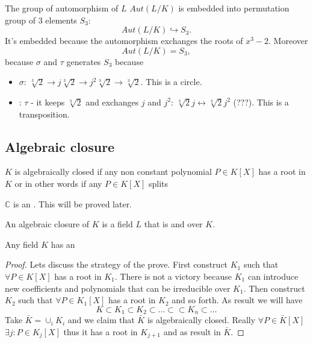 \begin{example}
  The group of automorphism of $L$ $Aut\left(L/K\right)$ is embedded
  into permutation group of 3 elements $S_3$:
  \[
  Aut\left(L/K\right) \hookrightarrow S_3.
  \]
  It's embedded because the automorphism exchanges the roots of
  $x^3-2$. Moreover
  \[
  Aut\left(L/K\right) = S_3,
  \]
  because $\sigma$ and $\tau$ generates $S_3$ because
  \begin{itemize}
  \item $\sigma$: $\sqrt[3]{2} \to j \sqrt[3]{2} \to j^2 \sqrt[3]{2}
    \to \sqrt[3]{2}$. This is a circle.
  \item: $\tau$ - it keeps $\sqrt[3]{2}$ and exchanges $j$ and $j^2$:
    $\sqrt[3]{2} j \leftrightarrow \sqrt[3]{2} j^2$ (???). This is a
    transposition. 
  \end{itemize}
\end{example}

\subsection{Algebraic closure}

\begin{definition}
  $K$ is algebraically closed if any non constant polynomial $P \in
  K\left[X\right]$ has a root in $K$ or in other words if any $P \in
  K\left[X\right]$ splits
  \label{def:algebraicallyclosed}
\end{definition}

\begin{example}[$\mathbb{C}$]
  $\mathbb{C}$ is an . This will be
  proved later.
\end{example}

\begin{definition}
  An algebraic closure of $K$ is a field $L$ that is
   and
  over $K$.
  \label{def:algebraicclosure}
\end{definition}

\begin{theorem}
  Any field $K$ has an 
  \begin{proof}
    Lets discuss the strategy of the prove.
    First construct $K_1$ such that $\forall P \in K\left[X\right]$
    has a root in $K_1$. There is not a victory because $K_1$ can
    introduce new coefficients and polynomials that can be irreducible
    over $K_1$. Then construct $K_2$ such that $\forall P \in
    K_1\left[X\right]$ has a root in $K_2$ and so forth. As result we
    will have
    \[
    K \subset K_1 \subset K_2 \subset \dots \subset \subset K_n \subset \dots
    \]
    Take $\bar{K} = \cup_i K_i$ and we claim that $\bar{K}$ is
    algebraically closed. Really
    $\forall P \in \bar{K}\left[X\right]$ $\exists j: P \in
    K_j\left[X\right]$ thus it has a root in $K_{j+1}$ and as result
    in $\bar{K}$.
  \end{proof}
  \label{thm:lec2_2}
\end{theorem}

